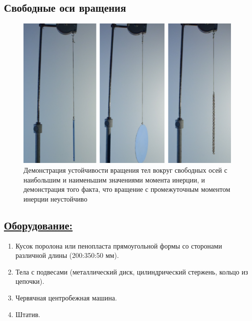 \documentclass[14pt,a4paper,oneside]{extarticle}	%
\begin{document}

\begin{center}
	\subsection*{Свободные оси вращения}
\end{center}

\begin{figure}[H] 	%
	\centering 		%
	\includegraphics[width=0.9\linewidth]{freeaxis-1.png}
	\caption{Демонстрация устойчивости вращения тел вокруг свободных осей с наибольшим и наименьшим значениями момента инерции, и демонстрация того факта, что вращение с промежуточным моментом инерции неустойчиво}
	\label{freeaxis-1}
\end{figure}

\subsection*{\underline{Оборудование:}}

\begin{enumerate}
	\item Кусок поролона или пенопласта прямоугольной формы со сторонами различной длины (200:350:50 мм).
	\item Тела с подвесами (металлический диск, цилиндрический стержень, кольцо из цепочки).
	\item Червячная центробежная машина.
	\item Штатив.
\end{enumerate}
\end{document}
